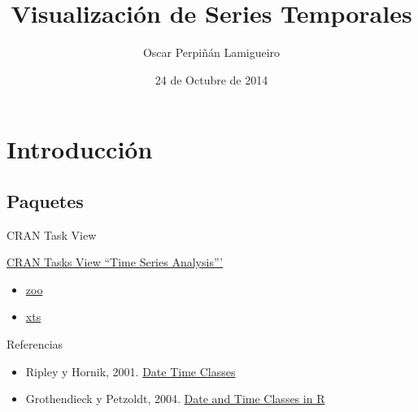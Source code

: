 \documentclass[xcolor={usenames,svgnames,dvipsnames}]{beamer}
\author{Oscar Perpiñán Lamigueiro}
\date{24 de Octubre de 2014}
\title{Visualización de Series Temporales}
\begin{document}
\maketitle

\section{Introducción}
\label{sec-1}

\subsection{Paquetes}
\label{sec-1-1}
\begin{frame}[label=sec-1-1-1]{CRAN Task View}
\begin{block}{\href{http://CRAN.R-project.org/view\%3DTimeSeries}{CRAN Tasks View ``Time Series Analysis'''}}
\begin{itemize}
\item \href{http://cran.r-project.org/web/packages/zoo/vignettes/zoo.pdf}{zoo}
\item \href{http://cran.r-project.org/web/packages/xts/vignettes/xts.pdf}{xts}
\end{itemize}
\end{block}
\begin{block}{Referencias}
\begin{itemize}
\item Ripley y Hornik, 2001. \href{http://CRAN.R-project.org/doc/Rnews/Rnews_2001-2.pdf}{Date Time Classes}
\item Grothendieck y Petzoldt, 2004. \href{http://CRAN.R-project.org/doc/Rnews/Rnews_2004-1.pdf}{Date and Time Classes in R}
\end{itemize}
\end{block}
\end{frame}
\end{document}
